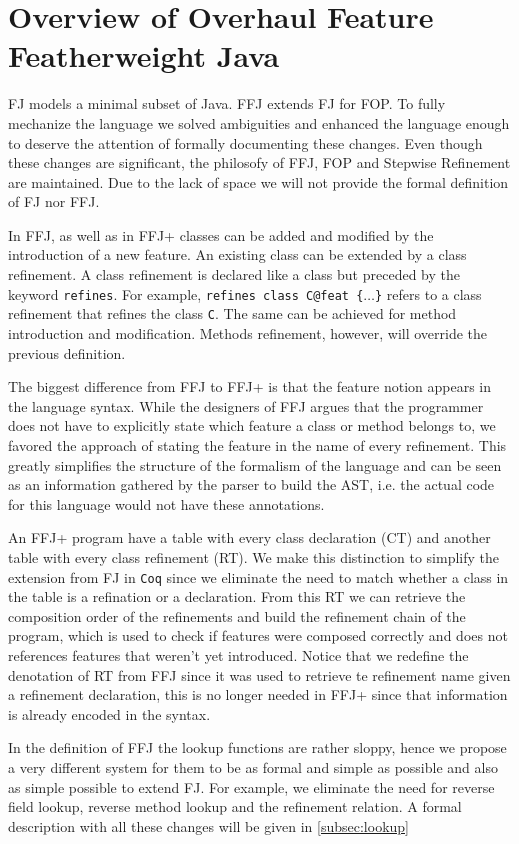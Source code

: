 \section{Overview of Overhaul Feature Featherweight Java}\label{seq:offj}

\ac{FJ} models a minimal subset of Java. \ac{FFJ} extends \ac{FJ} for \ac{FOP}.
To fully mechanize the language we solved ambiguities and enhanced the language enough
to deserve the attention of formally documenting these changes. 
Even though these changes are significant, the philosofy of \ac{FFJ}, \ac{FOP} and Stepwise Refinement are maintained.
Due to the lack of space we will not provide the formal definition of \ac{FJ} nor \ac{FFJ}.

In \ac{FFJ}, as well as in \ac{FFJ+} classes can be added and modified by the introduction of a new feature.
An existing class can be extended by a class refinement. A class refinement is declared like a class but
preceded by the keyword \texttt{refines}. For example, \texttt{refines class C@feat \{$\dots$\}} refers to a class refinement that
refines the class \texttt{C}. The same can be achieved for method introduction and modification. Methods refinement,
however, will override the previous definition.

The biggest difference from \ac{FFJ} to \ac{FFJ+} is that the feature notion appears in the language syntax.
While the designers of \ac{FFJ} argues that the programmer does not have to explicitly state which
feature a class or method belongs to, we favored the approach of stating the feature in the name of every refinement.
This greatly simplifies the structure of the formalism of the language and can be seen as an information gathered
by the parser to build the AST, i.e. the actual code for this language would not have these annotations.

An \ac{FFJ+} program have a table with every class declaration (\textsf{CT}) and another table with every class refinement (\textsf{RT}).
We make this distinction to simplify the extension from \ac{FJ} in \texttt{Coq} since we eliminate the need
to match whether a class in the table is a refination or a declaration. From this \textsf{RT} we can retrieve the composition order
of the refinements and build the refinement chain of the program, which is used to check if features were composed correctly and
does not references features that weren't yet introduced. Notice that we redefine the denotation of \textsf{RT} from \ac{FFJ}
since it was used to retrieve te refinement name given a refinement declaration, this is no longer needed in \ac{FFJ+} since
that information is already encoded in the syntax.

In the definition of \ac{FFJ} the lookup functions are rather sloppy, hence we propose a very different system
for them to be as formal and simple as possible and also as simple possible to extend \ac{FJ}. 
For example, we eliminate the need for reverse field lookup, reverse method lookup and the refinement relation.
A formal description with all these changes will be given in \ref{subsec:lookup}


